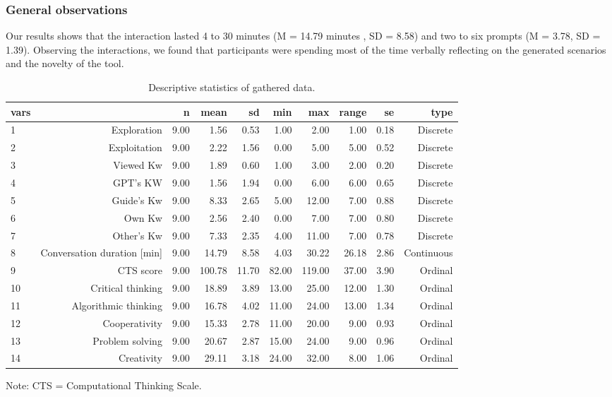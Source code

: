 \documentclass[sn-mathphys, Numbered]{sn-jnl}%
\theoremstyle{thmstyleone}%
\theoremstyle{thmstyletwo}%
\theoremstyle{thmstylethree}%
\begin{document}
\subsubsection*{General observations}
Our results shows that the interaction lasted 4 to 30 minutes (M = 14.79 minutes , SD = 8.58) and two to six prompts (M = 3.78, SD = 1.39). Observing the interactions, we found that participants were spending most of the time verbally reflecting on the generated scenarios and the novelty of the tool. 


\begin{table}[ht] \caption{Descriptive statistics of gathered data.}
\centering
\begin{tabular}{lrrrrrrrrr}
  \hline
  vars & & n & mean & sd & min & max & range & se & type \\
  \hline
   1&Exploration & 9.00 & 1.56 & 0.53 & 1.00 & 2.00 & 1.00 & 0.18 & Discrete \\
   2&Exploitation & 9.00 & 2.22 & 1.56 & 0.00 & 5.00 & 5.00 & 0.52 & Discrete \\
   3&Viewed Kw & 9.00 & 1.89& 0.60 & 1.00& 3.00& 2.00 & 0.20 & Discrete \\
   4&GPT's KW & 9.00 & 1.56 & 1.94 & 0.00 & 6.00 & 6.00 & 0.65 & Discrete \\
   5&Guide's Kw & 9.00 & 8.33 & 2.65 & 5.00 & 12.00 & 7.00 & 0.88 & Discrete \\
   6&Own Kw & 9.00 & 2.56 & 2.40 & 0.00 & 7.00 & 7.00 & 0.80 & Discrete \\
   7&Other's Kw & 9.00 & 7.33 & 2.35 & 4.00 & 11.00 & 7.00 & 0.78 & Discrete \\
   8&Conversation duration [min] & 9.00 & 14.79 & 8.58 & 4.03 & 30.22 & 26.18 & 2.86 & Continuous \\ 
   9&CTS score & 9.00 & 100.78 & 11.70 & 82.00 & 119.00 & 37.00 & 3.90 & Ordinal \\
   10&Critical thinking & 9.00 & 18.89 & 3.89 & 13.00 & 25.00 & 12.00 & 1.30 & Ordinal \\
   11&Algorithmic thinking & 9.00 & 16.78 & 4.02 & 11.00 & 24.00 & 13.00 & 1.34 & Ordinal \\
   12&Cooperativity & 9.00 & 15.33 & 2.78 & 11.00 & 20.00 & 9.00 & 0.93 & Ordinal \\
   13&Problem solving & 9.00 & 20.67 & 2.87 & 15.00 & 24.00 & 9.00 & 0.96 & Ordinal \\
   14&Creativity & 9.00 & 29.11 & 3.18 & 24.00 & 32.00 & 8.00 & 1.06 & Ordinal\\
   \hline
\end{tabular}
     Note: CTS = Computational Thinking Scale.
\label{summary}
\end{table}
\end{document}
